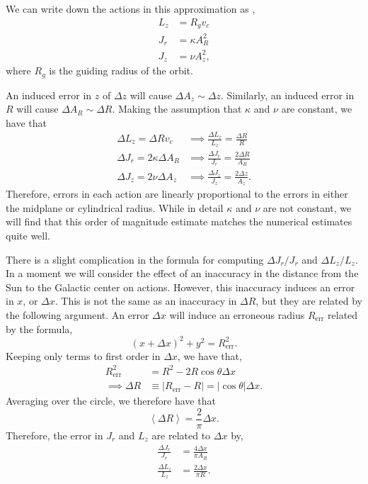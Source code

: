 \documentclass[twocolumn]{aastex62}
\newcommand{\abs}[1]{\left| #1 \right|}
\newcommand{\avg}[1]{\left< #1 \right>}
\newcommand{\beq}{\begin{equation}}
\newcommand{\eeq}{\end{equation}}
\begin{document}
We can write down the actions in this approximation as
\citep[Section~3.5.3b][]{2008gady.book.....B},
\beq\label{eq:actions_epi}
\begin{split}
L_z &= R_g v_c \\
J_r &= \kappa A_R^2 \\
J_z &= \nu A_z^2\text{,}
\end{split}
\eeq
where $R_g$ is the guiding radius of the orbit.

An induced error in $z$ of $\Delta z$ will cause $\Delta A_z \sim \Delta z$.
Similarly, an induced error in $R$ will cause $\Delta A_R \sim \Delta R$.
Making the assumption that $\kappa$ and $\nu$ are constant, we have that
\beq\label{eq:actions_epi_error}
\begin{split}
\Delta L_z = \Delta R v_c &\implies \frac{\Delta L_z}{L_z} = \frac{\Delta R}{R} \\
\Delta J_r = 2 \kappa \Delta A_R &\implies \frac{\Delta J_r}{J_r} = \frac{2\Delta R}{A_R} \\
\Delta J_z = 2 \nu \Delta A_z &\implies \frac{\Delta J_z}{J_z} = \frac{2\Delta z}{A_z}\text{.}
\end{split}
\eeq
Therefore, errors in each action are linearly proportional to the errors in
either the midplane or cylindrical radius. While in detail $\kappa$ and $\nu$
are not constant, we will find that this order of magnitude estimate matches
the numerical estimates quite well.

There is a slight complication in the formula for computing $\Delta J_r/J_r$
and $\Delta L_z/L_z$. In a moment we will consider the effect of an inaccuracy
in the distance from the Sun to the Galactic center on actions. However, this
inaccuracy induces an error in $x$, or $\Delta x$. This is not the same as an
inaccuracy in $\Delta R$, but they are related by the following argument. An
error $\Delta x$ will induce an erroneous radius $R_{\text{err}}$ related by
the formula,
\beq
(x+\Delta x)^2 + y^2 = R_{\text{err}}^2\text{.}
\eeq
Keeping only terms to first order in $\Delta x$, we have that,
\beq
\begin{split}
R_{\text{err}}^2 &= R^2 - 2 R \cos{\theta} \Delta x \\
\implies \Delta R &\equiv \abs{R_{\text{err}} - R} = \abs{\cos{\theta}} \Delta x\text{.}
\end{split}
\eeq
Averaging over the circle, we therefore have that
\beq
\avg{\Delta R} = \frac{2}{\pi} \Delta x\text{.}
\eeq
Therefore, the error in $J_r$ and $L_z$ are related to $\Delta x$ by,
\beq\label{eq:Jr_epi_dx}
\begin{split}
\frac{\Delta J_r}{J_r} &= \frac{4 \Delta x}{\pi A_R} \\
\frac{\Delta L_z}{L_z} &= \frac{2 \Delta x}{\pi R}\text{.}
\end{split}
\eeq
\end{document}
